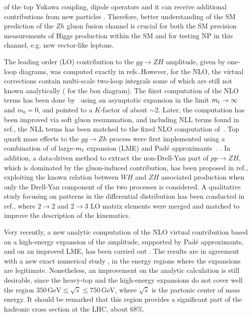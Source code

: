of the top Yukawa coupling,  dipole operators \cite{Englert:2016hvy}
and it can receive additional contributions from new particles \cite{Harlander:2013mla}. Therefore, better understanding of the SM prediction of the $Zh$ gluon fusion channel is crucial for both the SM precision measurements of Higgs production within the SM and for testing NP in this channel, e.g. new vector-like leptons.  
\par  The leading order (LO) contribution to the $g g \rightarrow Z H$ amplitude, given by one-loop diagrams, was computed exactly in refs.\cite{Kniehl:1990iva, Dicus:1988yh}.However, for the NLO, the virtual corrections contain multi-scale two-loop integrals some of which are still not known analytically ( for the box diagram).  The fiirst computation of the NLO terms has been done by~\cite{Altenkamp:2012sx} using an asymptotic expansion in the limit
$m_t \rightarrow \infty$ and $m_b = 0$, and pointed to a $K$-factor of about $\sim2$.  Later, the computation has been improved via soft gluon resummation, and including NLL terms found in ref.\cite{Harlander:2014wda}, the NLL terms has been matched to the fixed NLO computation of~\cite{Altenkamp:2012sx}.  Top quark mass effects to the  $g g \rightarrow Zh$ process were first implemented using a combination of of large-$m_t$ expansion (LME) and Pad\'e approximants~\cite{Hasselhuhn:2016rqt}. 
 .  In addition, a data-driven method to extract
the non-Drell-Yan part of $p p \rightarrow Z H$, which is dominated by
the gluon-induced contribution, has been proposed in
ref.\cite{Harlander:2018yns}, exploiting the known relation between $W H$
and $ Z H$ associated production when only the Drell-Yan component of
the two processes is considered.  A qualitative study focusing on
patterns in the differential distribution has been conducted in
ref.\cite{Hespel:2015zea}, where $2 \rightarrow 2$ and $2 \rightarrow 3$
LO matrix elements were merged and matched to improve the description
of the kinematics.

Very recently, a new analytic computation  of the NLO virtual contribution
based on a high-energy expansion of the amplitude, supported by Pad\'e
approximants, and on an improved LME, has been
carried out \cite{Davies:2020drs}. The results are in agreement with a new
exact numerical study \cite{Chen:2020gae}, in the energy regions where the
expansions are legitimate. Nonetheless, an improvement on the analytic
calculation is still desirable, since the heavy-top and the
high-energy expansions do not cover well the region
$350\,  \si{\GeV} \lesssim \sqrt{\hat{s}} \lesssim 750\,  \si{\GeV}$, where
$\sqrt{\hat{s}}$ is the partonic center of mass energy. It should be
remarked  that this region provides a significant part of the hadronic cross
section at the LHC, about 68\%.

